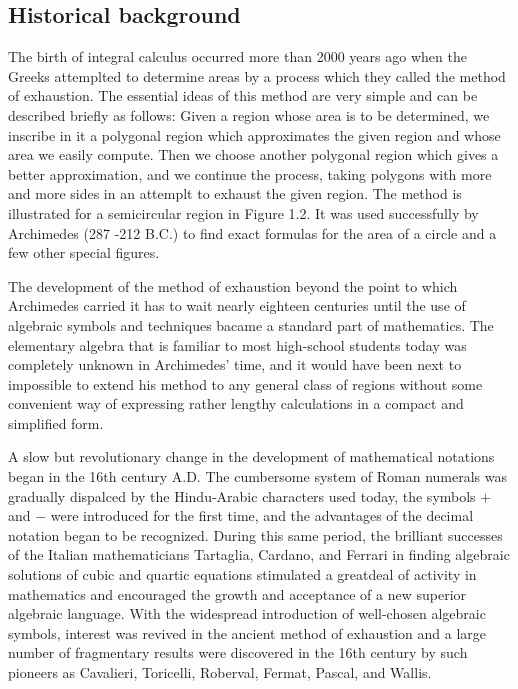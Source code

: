 \documentclass[cn,11pt,chinese]{elegantbook}
\numberwithin{equation}{section}
\begin{document}
\subsection{Historical background}
The birth of integral calculus occurred more than 2000 years ago when the Greeks attemplted to determine areas by a process which they called the method of exhaustion. The essential ideas of this method are very simple and can be described briefly as follows: Given a region whose area is to be determined, we inscribe in it a polygonal region which approximates the given region and whose area we easily compute. Then we choose another polygonal region which gives a better approximation, and we continue the process, taking polygons with more and more sides in an attemplt to exhaust the given region. The method is illustrated for a semicircular region in Figure 1.2. It was used successfully by Archimedes (287 -212 B.C.) to find exact formulas for the area of a circle and a few other special figures.

The development of the method of exhaustion beyond the point to which Archimedes carried it has to wait nearly eighteen centuries until the use of algebraic symbols and techniques bacame a standard part of mathematics. The elementary algebra that is familiar to most high-school students today was completely unknown in Archimedes' time, and it would have been next to impossible to extend his method to any general class of regions without some convenient way of expressing rather lengthy calculations in a compact and simplified form.

A slow but revolutionary change in the development of mathematical notations began in the 16th century A.D. The cumbersome system of Roman numerals was gradually dispalced by the Hindu-Arabic characters used today, the symbols $+$ and $-$ were introduced for the first time, and the advantages of the decimal notation began to be recognized. During this same period, the brilliant successes of the Italian mathematicians Tartaglia, Cardano, and Ferrari in finding algebraic solutions of cubic and quartic equations stimulated a greatdeal of activity in mathematics and encouraged the growth and acceptance of a new superior algebraic language. With the widespread introduction of well-chosen algebraic symbols, interest was revived in the ancient method of exhaustion and a large number of fragmentary results were discovered in the 16th century by such pioneers as Cavalieri, Toricelli, Roberval, Fermat, Pascal, and Wallis.
\end{document}
